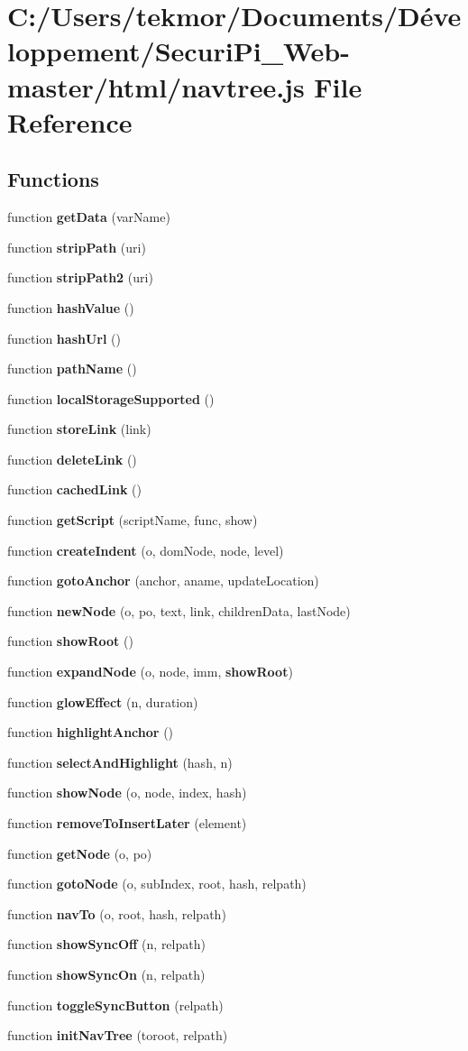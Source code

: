 \section{C\+:/\+Users/tekmor/\+Documents/\+Développement/\+Securi\+Pi\+\_\+\+Web-\/master/html/navtree.js File Reference}
\label{navtree_8js}
\subsection*{Functions}
\begin{DoxyCompactItemize}
\item 
function {\bf get\+Data} (var\+Name)
\item 
function {\bf strip\+Path} (uri)
\item 
function {\bf strip\+Path2} (uri)
\item 
function {\bf hash\+Value} ()
\item 
function {\bf hash\+Url} ()
\item 
function {\bf path\+Name} ()
\item 
function {\bf local\+Storage\+Supported} ()
\item 
function {\bf store\+Link} (link)
\item 
function {\bf delete\+Link} ()
\item 
function {\bf cached\+Link} ()
\item 
function {\bf get\+Script} (script\+Name, func, show)
\item 
function {\bf create\+Indent} (o, dom\+Node, node, level)
\item 
function {\bf goto\+Anchor} (anchor, aname, update\+Location)
\item 
function {\bf new\+Node} (o, po, text, link, children\+Data, last\+Node)
\item 
function {\bf show\+Root} ()
\item 
function {\bf expand\+Node} (o, node, imm, {\bf show\+Root})
\item 
function {\bf glow\+Effect} (n, duration)
\item 
function {\bf highlight\+Anchor} ()
\item 
function {\bf select\+And\+Highlight} (hash, n)
\item 
function {\bf show\+Node} (o, node, index, hash)
\item 
function {\bf remove\+To\+Insert\+Later} (element)
\item 
function {\bf get\+Node} (o, po)
\item 
function {\bf goto\+Node} (o, sub\+Index, root, hash, relpath)
\item 
function {\bf nav\+To} (o, root, hash, relpath)
\item 
function {\bf show\+Sync\+Off} (n, relpath)
\item 
function {\bf show\+Sync\+On} (n, relpath)
\item 
function {\bf toggle\+Sync\+Button} (relpath)
\item 
function {\bf init\+Nav\+Tree} (toroot, relpath)
\end{DoxyCompactItemize}

